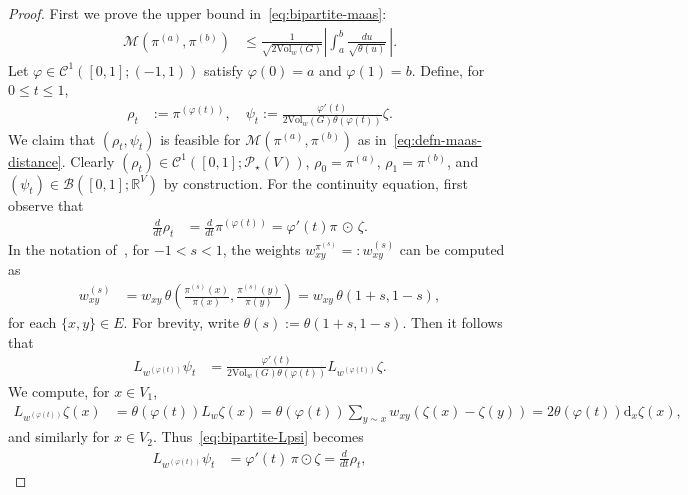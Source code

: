 \documentclass[11pt,a4paper]{article}
\newcommand{\Maas}{\mathcal{M}}
\newcommand{\Prob}{\mathscr{P}}
\newcommand{\Deg}{\mathrm{d}}
\newcommand{\Vol}{\mathrm{Vol}}
\begin{document}
\begin{proof}
    First we prove the upper bound in~\cref{eq:bipartite-maas}:
        \begin{align}\label{eq:bipartite-maas-upper}
            \Maas(\pi^{(a)},\pi^{(b)}) &\leq \frac{1}{\sqrt{2\Vol_w(G)}} \left| \int_a^{b} \frac{du}{\sqrt{\theta(u)}}\,\right|.
        \end{align}
    Let $\varphi\in\mathcal{C}^{1}([0,1];(-1,1))$ satisfy $\varphi(0) = a$ and $\varphi(1) = b$. Define, for $0\le t\le 1$,
        \begin{align*}
            \rho_t &:= \pi^{(\varphi(t))},\quad \psi_t := \frac{\varphi'(t)}{2\Vol_w(G) \theta(\varphi(t))}\zeta.
        \end{align*}
    We claim that $(\rho_t,\psi_t)$ is feasible for $\Maas(\pi^{(a)},\pi^{(b)})$ as in~\cref{eq:defn-maas-distance}. Clearly $(\rho_t)\in\mathcal{C}^{1}([0,1];\Prob_\star(V))$, $\rho_0 = \pi^{(a)}$, $\rho_1 = \pi^{(b)}$, and $(\psi_t)\in \mathcal{B}([0,1];\mathbb{R}^{V})$ by construction. For the continuity equation, first observe that
        \begin{align*}
            \frac{d}{dt} \rho_t &= \frac{d}{dt} \pi^{(\varphi(t))} = \varphi'(t)  \pi\,\odot\,\zeta.
        \end{align*}
    In the notation of~, for $-1<s<1$, the weights $w_{xy}^{\pi^{(s)}} =: w_{xy}^{(s)}$ can be computed as
        \begin{align*}
            w_{xy}^{(s)} &= w_{xy} \, \theta\left(\frac{\pi^{(s)}(x)}{\pi(x)}, \frac{\pi^{(s)}(y)}{\pi(y)}\right) = w_{xy}\, \theta(1+s, 1-s),
        \end{align*}
    for each $\{x, y\}\in E$. For brevity, write $\theta(s):= \theta(1+s, 1-s)$. Then it follows that
        \begin{align}\label{eq:bipartite-Lpsi}
            L_{w^{(\varphi(t))}}\psi_t &= \frac{\varphi'(t)}{2\Vol_w(G) \theta(\varphi(t))} L_{w^{(\varphi(t))}}\zeta.
        \end{align}
    We compute, for $x\in V_1$,
        \begin{align*}
            L_{w^{(\varphi(t))}}\zeta(x) &= \theta(\varphi(t)) L_w \zeta(x) = \theta(\varphi(t)) \sum_{y\sim x} w_{xy}(\zeta(x)-\zeta(y)) = 2 \theta(\varphi(t)) \Deg_x \zeta(x),
        \end{align*}
    and similarly for $x\in V_2$. Thus~\cref{eq:bipartite-Lpsi} becomes
        \begin{align*}
            L_{w^{(\varphi(t))}}\psi_t & = \varphi'(t)\, \pi\odot \zeta = \frac{d}{dt}\rho_t,

\end{align*}
\end{proof}
\end{document}

